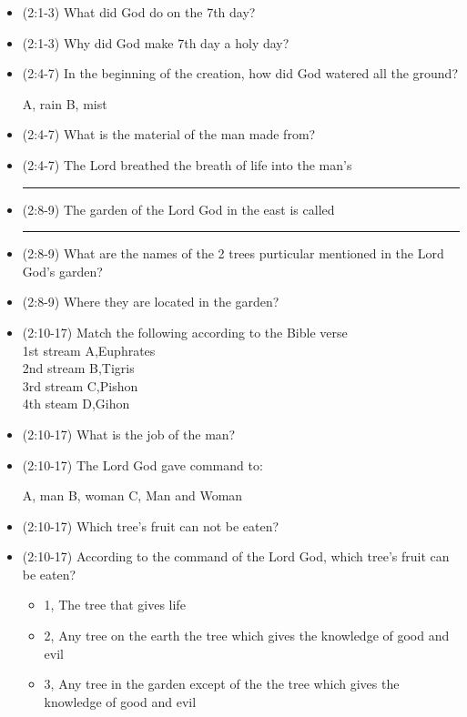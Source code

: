\begin{itemize}
\item (2:1-3) What did God do on the 7th day? 
\item (2:1-3) Why did God make 7th day a holy day?
\item (2:4-7) In the beginning of the creation, how did God watered all the ground?

A, rain \hspace{2cm} B, mist


\item (2:4-7) What is the material of the man made from?
\item (2:4-7) The Lord breathed the breath of life into the man’s  \rule[0cm]{1cm}{0.4pt}
\item (2:8-9) The garden of the Lord God in the east is called \rule[0cm]{1cm}{0.4pt}
\item (2:8-9) What are the names of the 2 trees purticular mentioned in the Lord God's garden? 
\item (2:8-9) Where they are located in the garden?
\item (2:10-17) Match the following according to the Bible verse\\
1st stream  \hspace{2cm}                         A,Euphrates      \\
2nd stream \hspace{2cm}  												B,Tigris\\
3rd stream  \hspace{2cm}  												C,Pishon\\
4th steam   \hspace{2cm}  												D,Gihon
\item (2:10-17) What is the job of the man?
\item (2:10-17) The Lord God gave command to:

A, man \hspace{2cm}  B, woman  \hspace{2cm}   C, Man and Woman
\item (2:10-17) Which tree's fruit can not be eaten?

\item (2:10-17) According to the command of the Lord God, which tree's fruit can be eaten?
\begin{itemize}
\item 1, The tree that gives life
\item 2, Any tree on the earth the tree which gives the knowledge of good and evil
\item 3, Any tree in the garden except of the the tree which gives the knowledge of good and evil
\end{itemize}
\end{itemize}






